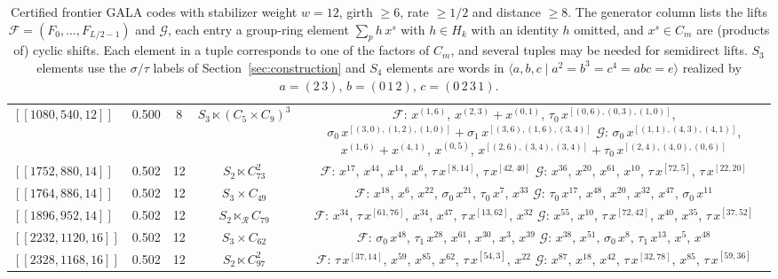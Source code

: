 \begin{table}[t]
\begin{tabular}{lcccc}
$[[1080, 540, 12]]$ & 0.500 & 8 & $S_{3} \ltimes (C_{5}\!\times\!C_{9})^{3}$ & \parbox[t]{0.46\textwidth}{\raggedright $\mathcal{F}$: $x^{(1,6)}$, $x^{(2,3)}{+}x^{(0,1)}$, $\tau_0\,x^{[(0,6),(0,3),(1,0)]}$, $\sigma_0\,x^{[(3,0),(1,2),(1,0)]}{+}\sigma_1\,x^{[(3,6),(1,6),(3,4)]}$ \\ $\mathcal{G}$: $\sigma_0\,x^{[(1,1),(4,3),(4,1)]}$, $x^{(1,6)}{+}x^{(4,1)}$, $x^{(0,5)}$, $x^{[(2,6),(3,4),(3,4)]}{+}\tau_0\,x^{[(2,4),(4,0),(0,6)]}$} \\
$[[1752, 880, 14]]$ & 0.502 & 12 & $S_{2} \ltimes C_{73}^{2}$ & \parbox[t]{0.46\textwidth}{\raggedright $\mathcal{F}$: $x^{17}$, $x^{44}$, $x^{14}$, $x^{6}$, $\tau\,x^{[8,14]}$, $\tau\,x^{[42,40]}$ \\ $\mathcal{G}$: $x^{36}$, $x^{20}$, $x^{61}$, $x^{10}$, $\tau\,x^{[72,5]}$, $\tau\,x^{[22,20]}$} \\
$[[1764, 886, 14]]$ & 0.502 & 12 & $S_{3} \times C_{49}$ & \parbox[t]{0.46\textwidth}{\raggedright $\mathcal{F}$: $x^{18}$, $x^{6}$, $x^{22}$, $\sigma_0\,x^{21}$, $\tau_0\,x^{7}$, $x^{33}$ \\ $\mathcal{G}$: $\tau_0\,x^{17}$, $x^{48}$, $x^{20}$, $x^{32}$, $x^{47}$, $\sigma_0\,x^{11}$} \\
$[[1896, 952, 14]]$ & 0.502 & 12 & $S_{2} \ltimes_{\mathcal{R}} C_{79}$ & \parbox[t]{0.46\textwidth}{\raggedright $\mathcal{F}$: $x^{34}$, $\tau\,x^{[61,76]}$, $x^{34}$, $x^{47}$, $\tau\,x^{[13,62]}$, $x^{32}$ \\ $\mathcal{G}$: $x^{55}$, $x^{10}$, $\tau\,x^{[72,42]}$, $x^{40}$, $x^{35}$, $\tau\,x^{[37,52]}$} \\
$[[2232, 1120, 16]]$ & 0.502 & 12 & $S_{3} \times C_{62}$ & \parbox[t]{0.46\textwidth}{\raggedright $\mathcal{F}$: $\sigma_0\,x^{48}$, $\tau_1\,x^{28}$, $x^{61}$, $x^{30}$, $x^{3}$, $x^{39}$ \\ $\mathcal{G}$: $x^{38}$, $x^{51}$, $\sigma_0\,x^{8}$, $\tau_1\,x^{13}$, $x^{5}$, $x^{48}$} \\
$[[2328, 1168, 16]]$ & 0.502 & 12 & $S_{2} \ltimes C_{97}^{2}$ & \parbox[t]{0.46\textwidth}{\raggedright $\mathcal{F}$: $\tau\,x^{[37,14]}$, $x^{59}$, $x^{85}$, $x^{62}$, $\tau\,x^{[54,3]}$, $x^{22}$ \\ $\mathcal{G}$: $x^{87}$, $x^{18}$, $x^{42}$, $\tau\,x^{[32,78]}$, $x^{85}$, $\tau\,x^{[59,36]}$} \\
\bottomrule
\end{tabular}
\caption{Certified frontier GALA codes with stabilizer weight $w=12$, girth $\geq6$, rate $\geq1/2$ and distance $\geq8$. The generator column lists the lifts $\mathcal F=(F_0,\dots,F_{L/2-1})$ and $\mathcal G$, each entry a group-ring element $\sum_p h\,x^{s}$ with $h\in H_k$ with an identity $h$ omitted, and $x^{s}\in C_m$ are (products of) cyclic shifts. Each element in a tuple corresponds to one of the factors of $C_m$, and several tuples may be needed for semidirect lifts. $S_3$ elements use the $\sigma/\tau$ labels of Section~\ref{sec:construction} and $S_4$ elements are words in $\langle a,b,c \mid a^2=b^3=c^4=abc=e\rangle$ realized by $a=(2\,3)$, $b=(0\,1\,2)$, $c=(0\,2\,3\,1)$.}
\label{tab:frontier-nondual}
\end{table}

